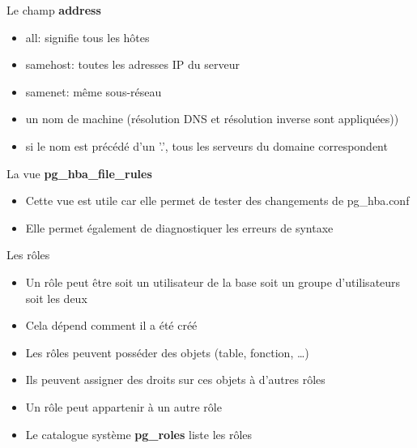 \begin{frame}[fragile]{Le champ \textbf{address}}

   \begin{itemize}
      \item all: signifie tous les hôtes
      \item samehost: toutes les adresses IP du serveur
      \item samenet: même sous-réseau
      \item un nom de machine (résolution DNS et résolution inverse sont appliquées))
      \item si le nom est précédé d'un '.', tous les serveurs du domaine correspondent
   \end{itemize}

\end{frame}


\begin{frame}[fragile]{La vue \textbf{pg\_hba\_file\_rules}}

   \begin{itemize}
      \item Cette vue est utile car elle permet de tester des changements de pg\_hba.conf
      \item Elle permet également de diagnostiquer les erreurs de syntaxe
   \end{itemize}
   
\begin{toile}
\end{toile}

\end{frame}


\begin{frame}[fragile]{Les rôles}

   \begin{itemize}
      \item Un rôle peut être soit un utilisateur de la base soit un groupe d'utilisateurs soit les deux
      \item Cela dépend comment il a été créé
      \item Les rôles peuvent posséder des objets (table, fonction, \ldots)
      \item Ils peuvent assigner des droits sur ces objets à d'autres rôles
      \item Un rôle peut appartenir à un autre rôle
      \item Le catalogue système \textbf{pg\_roles} liste les rôles
   \end{itemize}

\begin{toile}
\end{toile}

\end{frame}

